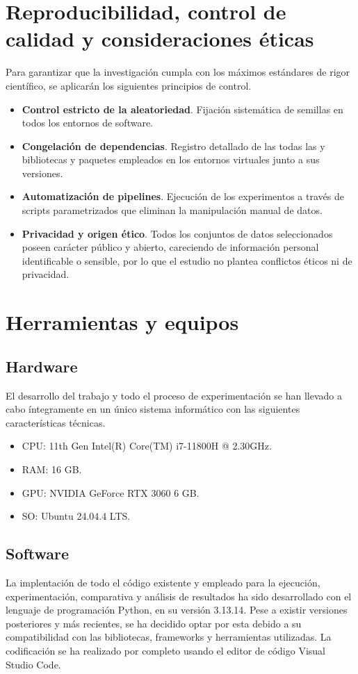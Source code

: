 \documentclass[a4paper,12pt,twoside,final]{book}
\begin{document}
\section{Reproducibilidad, control de calidad y consideraciones éticas}
Para garantizar que la investigación cumpla con los máximos estándares de rigor científico, se aplicarán los
siguientes principios de control.
\begin{itemize}
  \item \textbf{Control estricto de la aleatoriedad}. Fijación sistemática de semillas en todos los entornos de
  software.
  \item \textbf{Congelación de dependencias}. Registro detallado de las todas las y bibliotecas y paquetes empleados en
  los entornos virtuales junto a sus versiones.
  \item \textbf{Automatización de pipelines}. Ejecución de los experimentos a través de scripts parametrizados que
  eliminan la manipulación manual de datos.
  \item \textbf{Privacidad y origen ético}. Todos los conjuntos de datos seleccionados poseen carácter público y
  abierto, careciendo de información personal identificable o sensible, por lo que el estudio no plantea conflictos
  éticos ni de privacidad.
\end{itemize}

\section{Herramientas y equipos}
\subsection{Hardware}
El desarrollo del trabajo y todo el proceso de experimentación se han llevado a cabo íntegramente en un único sistema
informático con las siguientes características técnicas.
\begin{itemize}
  \item CPU: 11th Gen Intel(R) Core(TM) i7-11800H @ 2.30GHz.
  \item RAM: 16 GB.
  \item GPU: NVIDIA GeForce RTX 3060 6 GB.
  \item SO: Ubuntu 24.04.4 LTS.
\end{itemize}

\subsection{Software}
La implentación de todo el código existente y empleado para la ejecución, experimentación, comparativa y análisis de
resultados ha sido desarrollado con el lenguaje de programación Python, en su versión 3.13.14. Pese a existir
versiones posteriores y más recientes, se ha decidido optar por esta debido a su compatibilidad con las bibliotecas,
frameworks y herramientas utilizadas. La codificación se ha realizado por completo usando el editor de código Visual
Studio Code.\\
\end{document}
